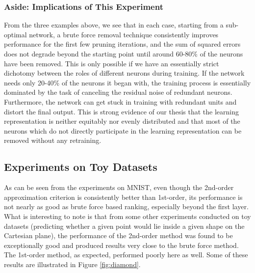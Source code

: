 \subsubsection{Aside: Implications of This Experiment}

From the three examples above, we see that in each case, starting from a sub-optimal network, a brute force removal technique consistently improves performance for the first few pruning iterations, and the sum of squared errors does not degrade beyond the starting point until around 60-80\% of the neurons have been removed. This is only possible if we have an essentially strict dichotomy between the roles of different neurons during training. If the network needs only 20-40\% of the neurons it began with, the training process is essentially dominated by the task of canceling the residual noise of redundant neurons. Furthermore, the network can get stuck in training with redundant units and distort the final output. This is strong evidence of our thesis that the learning representation is neither equitably nor evenly distributed and that most of the neurons which do not directly participate in the learning representation can be removed without any retraining. 

\subsection{Experiments on Toy Datasets}

As can be seen from the experiments on MNIST, even though the 2nd-order approximation criterion is consistently better than 1st-order, its performance is not nearly as good as brute force based ranking, especially beyond the first layer. What is interesting to note is that from some other experiments conducted on toy datasets (predicting whether a given point would lie inside a given shape on the Cartesian plane), the performance of the 2nd-order method was found to be exceptionally good and produced results very close to the brute force method. The 1st-order method, as expected, performed poorly here as well. Some of these results are illustrated in Figure \ref{fig:diamond}. 

